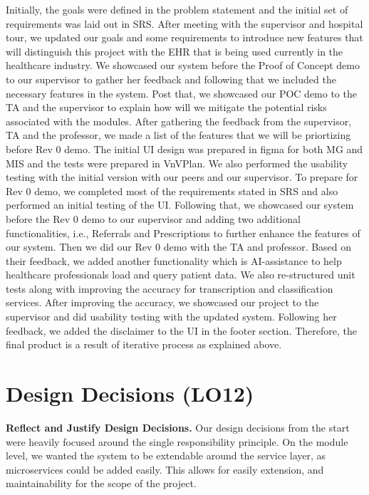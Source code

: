 \documentclass{article}
\begin{document}
Initially, the goals were defined in the problem statement and the initial set of requirements was laid out in SRS. After meeting with the supervisor and hospital tour, we updated our goals and some requirements to introduce new features that will distinguish this project with the EHR that is being used currently in the healthcare industry. We showcased our system before the Proof of Concept demo to our supervisor to gather her feedback and following that we included the necessary features in the system. Post that, we showcased our POC demo to the TA and the supervisor to explain how will we mitigate the potential risks associated with the modules. After gathering the feedback from the supervisor, TA and the professor, we made a list of the features that we will be priortizing before Rev 0 demo. The initial UI design was prepared in figma for both MG and MIS and the tests were prepared in VnVPlan. We also performed the usability testing with the initial version with our peers and our supervisor. To prepare for Rev 0 demo, we completed most of the requirements stated in SRS and also performed an initial testing of the UI. Following that, we showcased our system before the Rev 0 demo to our supervisor and adding two additional functionalities, i.e., Referrals and Prescriptions to further enhance the features of our system. Then we did our Rev 0 demo with the TA and professor. Based on their feedback, we added another functionality which is AI-assistance to help healthcare professionals load and query patient data. We also re-structured unit tests along with improving the accuracy for transcription and classification services. After improving the accuracy, we showcased our project to the supervisor and did usability testing with the updated system. Following her feedback, we added the disclaimer to the UI in the footer section. Therefore, the final product is a result of iterative process as explained above.        

\section{Design Decisions (LO12)}


\textbf{Reflect and Justify Design Decisions.}
Our design decisions from the start were heavily focused around the single responsibility principle. On the module level, we wanted the system to be extendable around the service layer, as microservices could be added easily. This allows for easily extension, and maintainability for the scope of the project. \\
\end{document}
